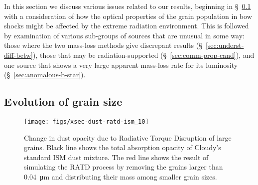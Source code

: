\documentclass[useAMS, usenatbib, a4paper]{mnras}
\begin{document}
In this section we discuss various issues related to our results,
beginning in \S~\ref{sec:evolution-grain-size} with a consideration of
how the optical properties of the grain population in bow shocks might
be affected by the extreme radiation environment.  This is followed by
examination of various sub-groups of sources that are unusual in some
way: those where the two mass-loss methods give discrepant results
(\S~\ref{sec:underst-diff-betw}), those that may be
radiation-supported (\S~\ref{sec:comm-prop-cand}), and one source that
shows a very large apparent mass-loss rate for its luminosity
(\S~\ref{sec:anomalous-b-star}).

\subsection{Evolution of grain size}
\label{sec:evolution-grain-size}

\begin{figure}
  \centering
  \texttt{[image: figs/xsec-dust-ratd-ism\_10]}
  \caption{Change in dust opacity due to Radiative Torque Disruption
    of large grains.  Black line shows the total absorption opacity of
    Cloudy's standard ISM dust mixture.  The red line shows the result
    of simulating the RATD process by removing the grains larger than
    \SI{0.04}{\um} and distributing their mass among smaller grain
    sizes.}
  \label{fig:ratd}
\end{figure}
\end{document}
